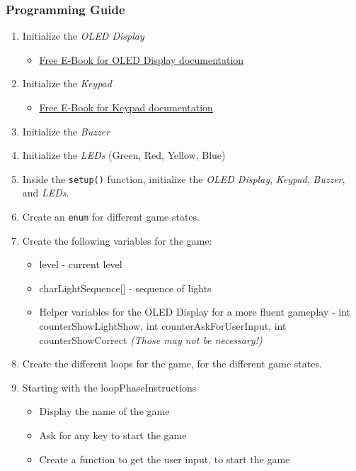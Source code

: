 \documentclass[10pt, oneside]{article}
\theoremstyle{remark}
\begin{document}
\subsubsection{Programming Guide}
\begin{enumerate}
  \item Initialize the \textit{OLED Display}
  \begin{itemize}
    \item \href{https://www.az-delivery.de/en/collections/kostenlose-e-books}{Free E-Book for OLED Display documentation}
  \end{itemize}
  \item Initialize the \textit{Keypad}
  \begin{itemize}
    \item \href{https://www.az-delivery.de/en/collections/kostenlose-e-books}{Free E-Book for Keypad documentation}
  \end{itemize}
  \item Initialize the \textit{Buzzer}
  \item Initialize the \textit{LEDs} (Green, Red, Yellow, Blue)
  \item Inside the \texttt{setup()} function, initialize the \textit{OLED Display}, \textit{Keypad}, \textit{Buzzer}, and \textit{LEDs}.
  \item Create an \texttt{enum} for different game states.
  \item Create the following variables for the game:
  \begin{itemize}
    \item level - current level
    \item charLightSequence[] - sequence of lights
    \item Helper variables for the OLED Display for a more fluent gameplay - int counterShowLightShow, int counterAskForUserInput, int counterShowCorrect \textit{(Those may not be necessary!)}
  \end{itemize}
  \item Create the different loops for the game, for the different game states.
  \item Starting with the loopPhaseInstructions
  \begin{itemize}
    \item Display the name of the game
    \item Ask for any key to start the game
    \item Create a function to get the user input, to start the game
  \end{itemize}

\end{enumerate}
\end{document}
